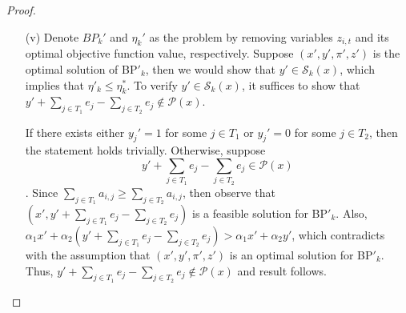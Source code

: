 \documentclass[11pt]{article}
\newcommand{\T}{\mathcal{T}}
\newcommand{\Pp}{\mathcal{P}}
\newcommand{\Ss}{\mathcal{S}}
\begin{document}
\begin{proof}
\begin{itemize}
		Assume $t_2 = (T_1, T_2)$. If $z'_{i, t_1} = 1$, then let $z^*_{i, t_2} = 1$ and $z^*_{i, t} = z'_{i, t}$ for all $i\in [m]$ and $t\in \T^k$. Then it is clear that $(x', y', \pi', z^*)$ satisfies constraint \eqref{eq:DNEG_interdiction_kopt1} as $z^*_{i, t_2} = z'_{i, t_1}$. On the other hand, if $z'_{i, t_1} = 0$, then there have two possible cases:
		\begin{itemize}
			\item if $y_j'=0$ for all $j\in T_1$ and $y_j'=1$ for all $j\in T_2$, then let $z*_{i, t_2} = 0$ and $z^*_{i, t} = z'_{i, t}$ for all $i\in [m]$ and $t\in \T^k$. Then $(x', y', \pi', z^*)$ is feasible for BP$_k$.
			\item if there exists either $y_j'= 0$ for $j\in T_2$ or $y_j'=1$ for some $j\in T_1$, then let  $z*_{i, t_2}=1$ and $z^*_{i, t} = z'_{i, t}$ for all $i\in [m]$ and $t\in \T^k$. Then the constructed solution $(x', y', \pi', z^*)$ is feasible for BP$_k$.
		\end{itemize}
		Therefore, the proof is completed.
		
		\item[(v)] Denote $BP_k'$ and $\eta_k'$ as the problem by removing variables $z_{i, t}$ and its optimal objective function value, respectively. Suppose $(x', y', \pi', z')$ is the optimal solution of BP$'_k$, then we would show that $y' \in \Ss_k(x)$, which implies that $\eta'_k \leq \eta^*_k$. To verify $y'\in \Ss_k(x)$, it suffices to show that $y' + \sum_{j\in T_1} e_{j} - \sum_{j\in T_2} e_j \notin \Pp(x)$.
		
		If there exists either $y_j' = 1$ for some $j\in T_1$ or $y_j'=0$ for some $j\in T_2$, then the statement holds trivially. Otherwise, suppose $$y' + \sum_{j\in T_1} e_{j} - \sum_{j\in T_2} e_j \in \Pp(x)$$. Since $\sum_{j\in T_1} a_{i,j} \geq \sum_{j\in T_2} a_{i,j}$, then observe that $(x', y' + \sum_{j\in T_1} e_{j} - \sum_{j\in T_2} e_j)$ is a feasible solution for BP$'_k$. Also, $\alpha_1x' + \alpha_2(y' + \sum_{j\in T_1} e_{j} - \sum_{j\in T_2} e_j) > \alpha_1x' + \alpha_2 y'$, which contradicts with the assumption that $(x', y', \pi', z')$ is an optimal solution for BP$'_k$. Thus, $y' + \sum_{j\in T_1} e_{j} - \sum_{j\in T_2} e_j \notin \Pp(x)$ and result follows.
	\end{itemize}
	
\end{proof}
\end{document}
